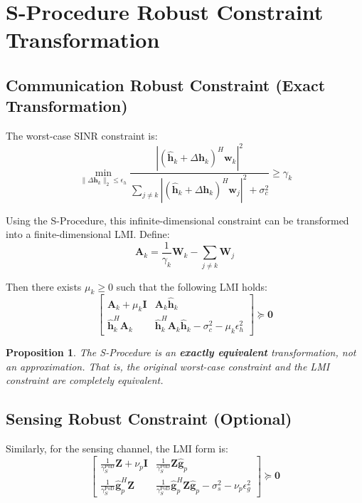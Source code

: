 \documentclass[12pt,a4paper]{article}
\newtheorem{proposition}{Proposition}
\newcommand{\vect}[1]{\mathbf{#1}}
\newcommand{\mat}[1]{\mathbf{#1}}
\newcommand{\norm}[1]{\|#1\|_2}
\begin{document}
\section{S-Procedure Robust Constraint Transformation}

\subsection{Communication Robust Constraint (Exact Transformation)}

The worst-case SINR constraint is:
\begin{equation}
\min_{\norm{\Delta\vect{h}_k} \leq \epsilon_h} \frac{|(\hat{\vect{h}}_k + \Delta\vect{h}_k)^H \vect{w}_k|^2}{\sum_{j \neq k} |(\hat{\vect{h}}_k + \Delta\vect{h}_k)^H \vect{w}_j|^2 + \sigma_c^2} \geq \gamma_k
\end{equation}

Using the S-Procedure, this infinite-dimensional constraint can be transformed into a finite-dimensional LMI. Define:
\begin{equation}
\mat{A}_k = \frac{1}{\gamma_k} \mat{W}_k - \sum_{j \neq k} \mat{W}_j
\end{equation}

Then there exists $\mu_k \geq 0$ such that the following LMI holds:
\begin{equation}
\begin{bmatrix} \mat{A}_k + \mu_k \mat{I} & \mat{A}_k \hat{\vect{h}}_k \\[1.5ex] \hat{\vect{h}}_k^H \mat{A}_k & \hat{\vect{h}}_k^H \mat{A}_k \hat{\vect{h}}_k - \sigma_c^2 - \mu_k \epsilon_h^2 \end{bmatrix} \succeq \mat{0} \tag{18}
\end{equation}

\begin{proposition}
The S-Procedure is an \textbf{exactly equivalent} transformation, not an approximation. That is, the original worst-case constraint and the LMI constraint are completely equivalent.
\end{proposition}

\subsection{Sensing Robust Constraint (Optional)}

Similarly, for the sensing channel, the LMI form is:
\begin{equation}
\begin{bmatrix} \frac{1}{\gamma_S^{\text{PoD}}} \mat{Z} + \nu_p \mat{I} & \frac{1}{\gamma_S^{\text{PoD}}} \mat{Z} \hat{\vect{g}}_p \\[1.5ex] \frac{1}{\gamma_S^{\text{PoD}}} \hat{\vect{g}}_p^H \mat{Z} & \frac{1}{\gamma_S^{\text{PoD}}} \hat{\vect{g}}_p^H \mat{Z} \hat{\vect{g}}_p - \sigma_s^2 - \nu_p \epsilon_g^2 \end{bmatrix} \succeq \mat{0} \tag{19}
\end{equation}
\end{document}
